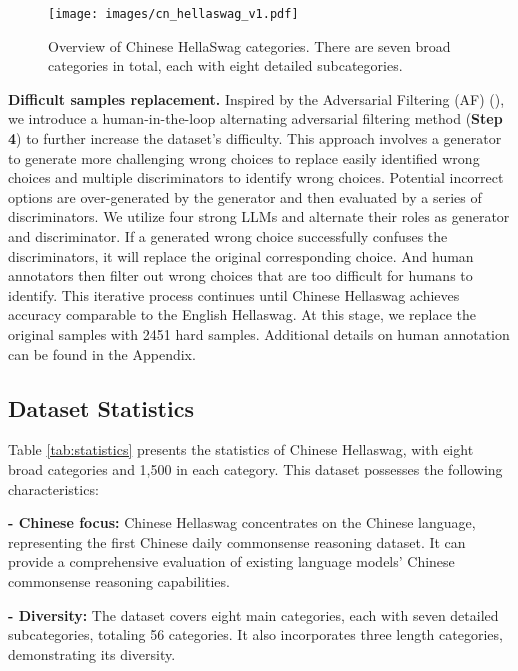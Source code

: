 \begin{figure}[t]   
\centering
\setlength{\abovecaptionskip}{0.1cm}
\setlength{\belowcaptionskip}{0cm}
\texttt{[image: images/cn\_hellaswag\_v1.pdf]}
\caption{Overview of Chinese HellaSwag categories. There are seven broad categories in total, each with eight detailed subcategories.}
\label{cn_hellaswag}
\end{figure}

\textbf{Difficult samples replacement.}
Inspired by the Adversarial Filtering (AF) (\citealp{zellers2018swag}), we introduce a human-in-the-loop alternating adversarial filtering method (\textbf{Step 4}) to further increase the dataset's difficulty. 
This approach involves a generator to generate more challenging wrong choices to replace easily identified wrong choices and multiple discriminators to identify wrong choices. 
Potential incorrect options are over-generated by the generator and then evaluated by a series of discriminators. We utilize four strong LLMs and alternate their roles as generator and discriminator. If a generated wrong choice successfully confuses the discriminators, it will replace the original corresponding choice. And human annotators then filter out wrong choices that are too difficult for humans to identify. This iterative process continues until Chinese Hellaswag achieves accuracy comparable to the English Hellaswag. At this stage, we replace the original samples with 2451 hard samples. Additional details on human annotation can be found in the Appendix.

\subsection{Dataset Statistics}

Table \ref{tab:statistics} presents the statistics of Chinese Hellaswag, with eight broad categories and 1,500 in each category. This dataset possesses the following characteristics:

\noindent %
\textbf{- Chinese focus:} Chinese Hellaswag concentrates on the Chinese language, representing the first Chinese daily commonsense reasoning dataset. It can provide a comprehensive evaluation of existing language models' Chinese commonsense reasoning capabilities.

\noindent %
\textbf{- Diversity:} The dataset covers eight main categories, each with seven detailed subcategories, totaling 56 categories. It also incorporates three length categories, demonstrating its diversity.

